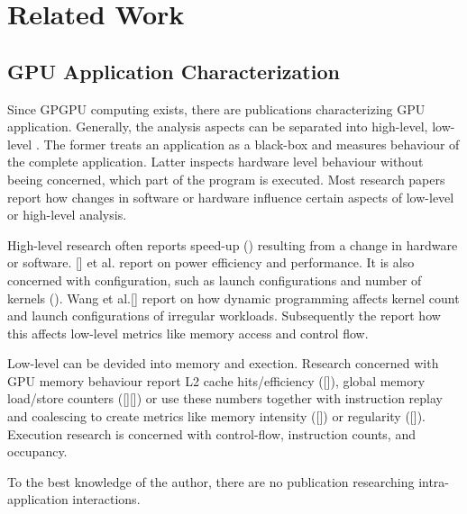 \chapter{Related Work}
\section{GPU Application Characterization}
Since GPGPU computing exists, there are publications characterizing GPU application. Generally, the analysis
aspects can be separated into high-level, low-level . The former treats an application as a black-box
and measures behaviour of the complete application. Latter inspects hardware level behaviour without
beeing concerned, which part of the program is executed. Most research papers report how changes in software or hardware influence certain aspects of low-level or high-level analysis.

High-level research often reports speed-up () resulting from a change in hardware or software. [] et al. report on power efficiency and performance. 
It is also concerned with configuration, such as launch configurations and number of kernels (). Wang et al.[] report on how dynamic programming affects kernel count and launch configurations of irregular workloads. Subsequently the report how this affects low-level metrics like memory access and control flow.

Low-level can be devided into memory and exection.
Research concerned with GPU memory behaviour report L2 cache hits/efficiency ([]), global memory load/store counters ([][]) or use these numbers together with instruction replay and coalescing to create metrics like memory intensity ([]) or regularity ([]).  Execution research is concerned with control-flow, instruction counts, and occupancy.

To the best  knowledge of the author, there are no publication researching intra-application interactions.
